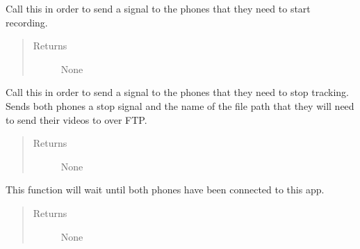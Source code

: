 \documentclass[letterpaper,10pt,english]{sphinxmanual}
\begin{document}
\begin{fulllineitems}

\begin{fulllineitems}
\label{\detokenize{index:src.Controllers.PhoneController.PhoneControl.startRecording}}
Call this in order to send a signal to the phones that they need to start recording.
\begin{quote}\begin{description}
\item[{Returns}] \leavevmode
None

\end{description}\end{quote}

\end{fulllineitems}


\begin{fulllineitems}
\label{\detokenize{index:src.Controllers.PhoneController.PhoneControl.stopRecording}}
Call this in order to send a signal to the phones that they need to stop tracking. Sends both
phones a stop signal and the name of the file path that they will need to send their
videos to over FTP.
\begin{quote}\begin{description}
\item[{Returns}] \leavevmode
None

\end{description}\end{quote}

\end{fulllineitems}


\begin{fulllineitems}
\label{\detokenize{index:src.Controllers.PhoneController.PhoneControl.sync}}
This function will wait until both phones have been connected to this app.
\begin{quote}\begin{description}
\item[{Returns}] \leavevmode
None


\end{description}
\end{quote}
\end{fulllineitems}
\end{fulllineitems}
\end{document}
